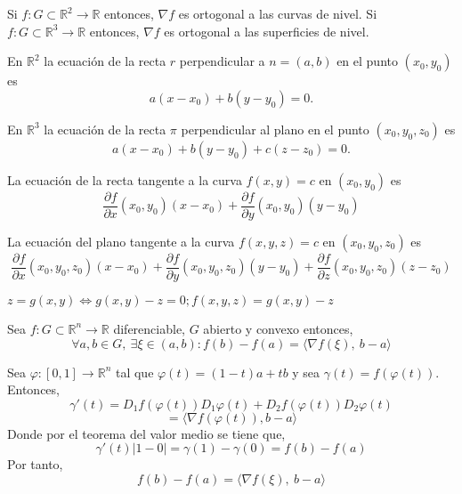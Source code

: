 \begin{cor}
Si $f:G\subset \mathbb{R}^2 \rightarrow \mathbb{R}$ entonces, $\nabla{f}$ es ortogonal a las curvas de nivel. Si $f:G\subset \mathbb{R}^3 \rightarrow \mathbb{R}$ entonces, $\nabla{f}$ es ortogonal a las superficies de nivel.
\end{cor}

\begin{obs}
En $\mathbb{R}^2$ la ecuación de la recta $r$ perpendicular a $n = (a,b)$ en el punto $(x_0,y_0)$ es \[ a(x - x_0) + b(y - y_0) = 0. \]

En $\mathbb{R}^3$ la ecuación de la recta $\pi$ perpendicular al plano en el punto $(x_0,y_0,z_0)$ es \[ a(x - x_0) + b(y - y_0) + c(z - z_0) = 0. \] 
\end{obs}

\begin{defn}
La ecuación de la recta tangente a la curva $f(x,y) = c$ en $(x_0,y_0)$ es \[ \frac{\partial f}{\partial x}(x_0,y_0)(x - x_0) + \frac{\partial f}{\partial y}(x_0,y_0)(y - y_0) \]

La ecuación del plano tangente a la curva $f(x,y,z) = c$ en $(x_0,y_0,z_0)$ es \[ \frac{\partial f}{\partial x}(x_0,y_0,z_0)(x - x_0) + \frac{\partial f}{\partial y}(x_0,y_0,z_0)(y - y_0) + \frac{\partial f}{\partial z}(x_0,y_0,z_0)(z - z_0)\]
\end{defn}

\begin{obs}
$z = g(x,y) \Leftrightarrow g(x,y) - z = 0 ; f(x,y,z) = g(x,y) - z$
\end{obs}

\begin{theo}
Sea $f:G\subset \mathbb{R}^n\rightarrow \mathbb{R}$ diferenciable, $G$ abierto y convexo entonces,
\[ \forall a,b\in G, \ \exists \xi \in(a,b): f(b) - f(a) = \langle \nabla{f(\xi)} {,}\ b - a\rangle \]
\end{theo}

\begin{dem}
Sea $\varphi:[0,1]\rightarrow \mathbb{R}^n$ tal que $\varphi(t) = (1-t)a + tb$ y sea $\gamma(t) = f(\varphi(t))$. Entonces, \[ \gamma'(t) = D_1f(\varphi(t))D_1\varphi(t) + D_2f(\varphi(t))D_2\varphi(t) \]  \[= \langle \nabla f(\varphi(t)), b - a \rangle \] Donde por el teorema del valor medio se tiene que, \[ \gamma'(t)|1-0| = \gamma(1) - \gamma(0) = f(b) - f(a)\] Por tanto, \[ f(b) - f(a) = \langle \nabla{f(\xi)} {,}\ b - a\rangle \]
\end{dem}

